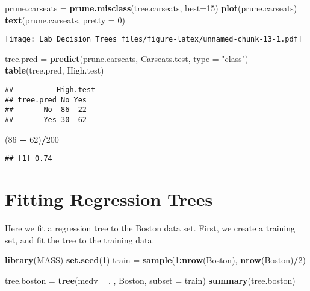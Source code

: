 \documentclass[]{article}
\newenvironment{Shaded}{\begin{snugshade}}{\end{snugshade}}
\newcommand{\KeywordTok}[1]{\textcolor[rgb]{0.13,0.29,0.53}{\textbf{#1}}}
\newcommand{\DataTypeTok}[1]{\textcolor[rgb]{0.13,0.29,0.53}{#1}}
\newcommand{\DecValTok}[1]{\textcolor[rgb]{0.00,0.00,0.81}{#1}}
\newcommand{\StringTok}[1]{\textcolor[rgb]{0.31,0.60,0.02}{#1}}
\newcommand{\OperatorTok}[1]{\textcolor[rgb]{0.81,0.36,0.00}{\textbf{#1}}}
\newcommand{\NormalTok}[1]{#1}
\begin{document}
\begin{Shaded}
\begin{Highlighting}[]
\NormalTok{prune.carseats =}\StringTok{ }\KeywordTok{prune.misclass}\NormalTok{(tree.carseats, }\DataTypeTok{best=}\DecValTok{15}\NormalTok{)}
\KeywordTok{plot}\NormalTok{(prune.carseats)}
\KeywordTok{text}\NormalTok{(prune.carseats, }\DataTypeTok{pretty =} \DecValTok{0}\NormalTok{)}
\end{Highlighting}
\end{Shaded}

\texttt{[image: Lab\_Decision\_Trees\_files/figure-latex/unnamed-chunk-13-1.pdf]}

\begin{Shaded}
\begin{Highlighting}[]
\NormalTok{tree.pred =}\StringTok{ }\KeywordTok{predict}\NormalTok{(prune.carseats, Carseats.test, }\DataTypeTok{type =} \StringTok{"class"}\NormalTok{)}
\KeywordTok{table}\NormalTok{(tree.pred, High.test)}
\end{Highlighting}
\end{Shaded}

\begin{verbatim}
##          High.test
## tree.pred No Yes
##       No  86  22
##       Yes 30  62
\end{verbatim}

\begin{Shaded}
\begin{Highlighting}[]
\NormalTok{(}\DecValTok{86} \OperatorTok{+}\StringTok{ }\DecValTok{62}\NormalTok{)}\OperatorTok{/}\DecValTok{200}
\end{Highlighting}
\end{Shaded}

\begin{verbatim}
## [1] 0.74
\end{verbatim}

\section{Fitting Regression Trees}\label{fitting-regression-trees}

Here we fit a regression tree to the Boston data set. First, we create a
training set, and fit the tree to the training data.

\begin{Shaded}
\begin{Highlighting}[]
\KeywordTok{library}\NormalTok{(MASS)}
\KeywordTok{set.seed}\NormalTok{(}\DecValTok{1}\NormalTok{)}
\NormalTok{train =}\StringTok{ }\KeywordTok{sample}\NormalTok{(}\DecValTok{1}\OperatorTok{:}\KeywordTok{nrow}\NormalTok{(Boston), }\KeywordTok{nrow}\NormalTok{(Boston)}\OperatorTok{/}\DecValTok{2}\NormalTok{)}

\NormalTok{tree.boston =}\StringTok{ }\KeywordTok{tree}\NormalTok{(medv }\OperatorTok{~}\StringTok{ }\NormalTok{. , Boston, }\DataTypeTok{subset =}\NormalTok{ train)}
\KeywordTok{summary}\NormalTok{(tree.boston)}
\end{Highlighting}
\end{Shaded}
\end{document}
